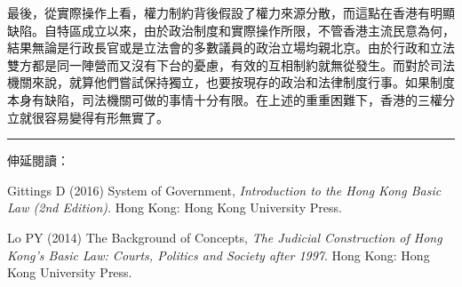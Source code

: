 最後，從實際操作上看，權力制約背後假設了權力來源分散，而這點在香港有明顯缺陷。自特區成立以來，由於政治制度和實際操作所限，不管香港主流民意為何，結果無論是行政長官或是立法會的多數議員的政治立場均親北京。由於行政和立法雙方都是同一陣營而又沒有下台的憂慮，有效的互相制約就無從發生。而對於司法機關來說，就算他們嘗試保持獨立，也要按現存的政治和法律制度行事。如果制度本身有缺陷，司法機關可做的事情十分有限。在上述的重重困難下，香港的三權分立就很容易變得有形無實了。

\rule[-10pt]{15cm}{0.05em}

伸延閱讀：

Gittings D (2016) System of Government, \textit{Introduction to the Hong Kong Basic Law (2nd Edition)}. Hong Kong: Hong Kong University Press.

Lo PY (2014) The Background of Concepts, \textit{The Judicial Construction of Hong Kong’s Basic Law: Courts, Politics and Society after 1997}. Hong Kong: Hong Kong University Press.